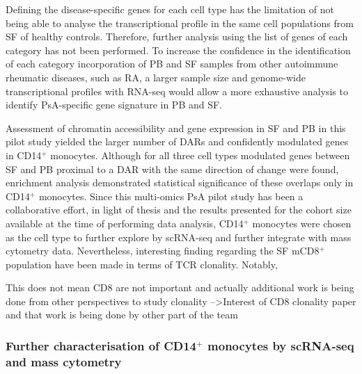 Defining the disease-specific genes for each cell type has the limitation of not being able to analyse the transcriptional profile in the same cell populations from SF of healthy controls. Therefore, further analysis using the list of genes of each category has not been performed. To increase the confidence in the identification of each category incorporation of PB and SF samples from other autoimmune rheumatic diseases, such as RA, a larger sample size and genome-wide transcriptional profiles with RNA-seq would allow a more exhaustive analysis to identify PsA-specific gene signature in PB and SF. 

Assessment of chromatin accessibility and gene expression in SF and PB in this pilot study yielded the larger number of DARs and confidently modulated genes in CD14$^+$ monocytes. Although for all three cell types modulated genes between SF and PB proximal to a DAR with the same direction of change were found, enrichment analysis demonstrated statistical significance of these overlaps only in CD14$^+$ monocytes. Since this multi-omics PsA pilot study has been a collaborative effort, in light of thesis and the results presented for the cohort size available at the time of performing data analysis, CD14$^+$ monocytes were chosen as the cell type to further explore by scRNA-seq and further integrate with mass cytometry data. Nevertheless, interesting finding regarding the SF mCD8$^+$ population have been made in terms of TCR clonality. Notably, 
 
This does not mean CD8 are not important and actually additional work is being done from other perspectives to study clonality -->Interest of CD8 clonality paper and that work is being done by other part of the team




\subsubsection{Further characterisation of CD14$^+$ monocytes by scRNA-seq and mass cytometry}

